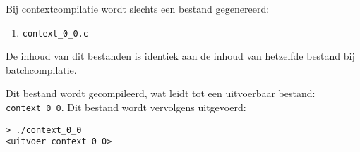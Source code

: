 Bij contextcompilatie wordt slechts een bestand gegenereerd:

\begin{enumerate}
    \item \texttt{context\_0\_0.c}
\end{enumerate}

De inhoud van dit bestanden is identiek aan de inhoud van hetzelfde bestand bij batchcompilatie.

Dit bestand wordt gecompileerd, wat leidt tot een uitvoerbaar bestand: \texttt{context\_0\_0}.
Dit bestand wordt vervolgens uitgevoerd:

\begin{verbatim}
> ./context_0_0
<uitvoer context_0_0>
\end{verbatim}
